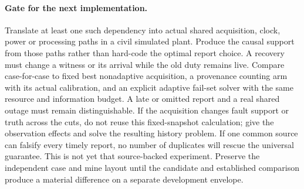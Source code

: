 \documentclass{article}
\begin{document}
\paragraph{Gate for the next implementation.}
Translate at least one such dependency into actual shared acquisition,
clock, power or processing paths in a civil simulated plant. Produce
the causal support from those paths rather than hard-code the optimal
report choice. A recovery must change a witness or its arrival while
the old duty remains live. Compare case-for-case to fixed best
nonadaptive acquisition, a provenance counting arm with its actual
calibration, and an explicit adaptive fail-set solver with the same
resource and information budget. A late or omitted report and a real
shared outage must remain distinguishable. If the acquisition changes
fault support or truth across the cuts, do not reuse this fixed-snapshot
calculation; give the observation effects and solve the resulting
history problem. If one common source can falsify every timely report,
no number of duplicates will rescue the universal guarantee. This is
not yet that source-backed experiment. Preserve the independent
case and mine layout until the candidate and established comparison
produce a material difference on a separate development envelope.
\end{document}
